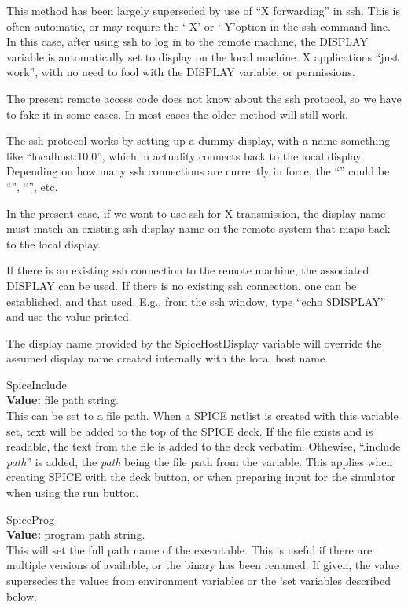 \begin{description}
This method has been largely superseded by use of ``X forwarding'' in
{\vt ssh}.  This is often automatic, or may require the `{\vt -X}' or
`{\vt -Y}'option in the {\vt ssh} command line.  In this case, after
using {\vt ssh} to log in to the remote machine, the {\et DISPLAY}
variable is automatically set to display on the local machine.  X
applications ``just work'', with no need to fool with the {\et
DISPLAY} variable, or permissions.

The present {\Xic} remote access code does not know about the {\vt
ssh} protocol, so we have to fake it in some cases.  In most cases the
older method will still work.

The {\vt ssh} protocol works by setting up a dummy display, with a
name something like ``{\vt localhost:10.0}'', which in actuality
connects back to the local display.  Depending on how many {\vt ssh}
connections are currently in force, the ``{}'' could be ``{}'', ``{}'', etc.

In the present case, if we want to use {\vt ssh} for X transmission,
the display name must match an existing {\vt ssh} display name on the
remote system that maps back to the local display.

If there is an existing {\vt ssh} connection to the remote machine,
the associated {\et DISPLAY} can be used.  If there is no existing
{\vt ssh} connection, one can be established, and that used.  E.g.,
from the {\vt ssh} window, type ``{\vt echo \$DISPLAY}'' and use the
value printed.

The display name provided by the {\et SpiceHostDisplay} variable will
override the assumed display name created internally with the local
host name.

\item{\et SpiceInclude}\\
{\bf Value:} file path string.\\
This can be set to a file path.  When a SPICE netlist is created with
this variable set, text will be added to the top of the SPICE deck. 
If the file exists and is readable, the text from the file is added to
the deck verbatim.  Othewise, ``{\vt .include} {\it path\/}'' is
added, the {\it path} being the file path from the variable.  This
applies when creating SPICE with the {\cb deck} button, or when
preparing input for the simulator when using the {\cb run} button.

\item{\et SpiceProg}\\
{\bf Value:} program path string.\\
This will set the full path name of the {\WRspice} executable.  This
is useful if there are multiple versions of {\WRspice} available, or
the binary has been renamed.  If given, the value supersedes the
values from environment variables or the {\cb !set} variables
described below.


\end{description}
